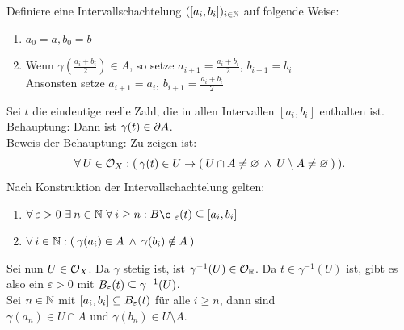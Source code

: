     \begin{bew}
        Definiere eine Intervallschachtelung $([a_i, b_i])_{i \in \mathbb{N}}$ auf folgende Weise:
        \begin{enumerate}
            \item $a_0 = a, b_0 = b$
            \item Wenn $\gamma(\frac{a_i + b_i}{2}) \in A$, so setze $a_{i+1} = \frac{a_i + b_i}{2}$, $b_{i+1} = b_i$\\
            Ansonsten setze $a_{i+1} = a_i$, $b_{i+1} = \frac{a_i + b_i}{2}$
        \end{enumerate}
        Sei $t$ die eindeutige reelle Zahl, die in allen Intervallen $[a_i, b_i]$ enthalten ist.\\
        Behauptung: Dann ist $\gamma(t) \in \partial A$.\\
        Beweis der Behauptung: Zu zeigen ist: 
        \[\forall\: U \in \mathcal{O}_X: (\: \gamma(t) \in U \rightarrow (\: U \cap A \neq \varnothing \:\land\: U \setminus A \neq \varnothing \:) \:).\]
        Nach Konstruktion der Intervallschachtelung gelten:
        \begin{enumerate}
        \item $\forall\: \varepsilon > 0\ \exists\: n \in \N\ \forall\: i \geq n: \ball¸_\varepsilon(t) \subseteq [a_i,b_i]$
        \item $\forall\: i \in \mathbb{N} : (\: \gamma(a_i) \in A \:\land\: \gamma(b_i) \notin A \:)$
        \end{enumerate}
        Sei nun ${U \in \mathcal{O}_X}$. Da $\gamma$ stetig ist, ist ${\gamma^{-1}(U) \in \mathcal{O}_{\mathbb{R}}}$. Da ${t \in \gamma^{-1}(U)}$ ist, gibt es also ein ${\varepsilon > 0}$ mit ${B_\varepsilon(t) \subseteq \gamma^{-1}(U)}$.\\
        Sei ${n \in \mathbb{N}}$ mit ${[a_i, b_i] \subseteq B_\varepsilon(t)}$ für alle ${i \geq n}$, dann sind \\
        ${\gamma(a_n) \in U \cap A}$ und ${\gamma(b_n) \in U \setminus A}$.
    \end{bew}
